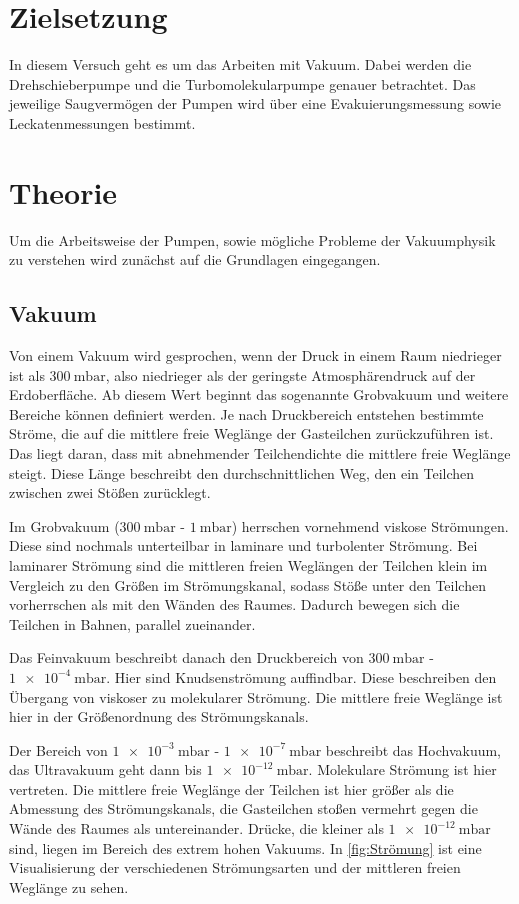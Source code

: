 \section{Zielsetzung}
    In diesem Versuch geht es um das Arbeiten mit Vakuum.
    Dabei werden die Drehschieberpumpe und die Turbomolekularpumpe genauer betrachtet.
    Das jeweilige Saugvermögen der Pumpen wird über eine Evakuierungsmessung sowie Leckatenmessungen bestimmt.

\section{Theorie}
\label{sec:Theorie}
    Um die Arbeitsweise der Pumpen, sowie mögliche Probleme der Vakuumphysik zu verstehen wird zunächst auf die Grundlagen eingegangen.
    \subsection{Vakuum}
        Von einem Vakuum wird gesprochen, wenn der Druck in einem Raum niedrieger ist als $\SI{300}{\milli\bar}$, also niedrieger als der geringste Atmosphärendruck auf der Erdoberfläche.
        Ab diesem Wert beginnt das sogenannte Grobvakuum und weitere Bereiche können definiert werden.
        Je nach Druckbereich entstehen bestimmte Ströme, die auf die mittlere freie Weglänge der Gasteilchen zurückzuführen ist.
        Das liegt daran, dass mit abnehmender Teilchendichte die mittlere freie Weglänge steigt.
        Diese Länge beschreibt den durchschnittlichen Weg, den ein Teilchen zwischen zwei Stößen zurücklegt. 

        \noindent
        Im Grobvakuum ($\SI{300}{\milli\bar}$ - $\SI{1}{\milli\bar}$) herrschen vornehmend viskose Strömungen.
        Diese sind nochmals unterteilbar in laminare und turbolenter Strömung.
        Bei laminarer Strömung sind die mittleren freien Weglängen der Teilchen klein im Vergleich zu den Größen im Strömungskanal, sodass Stöße unter den Teilchen vorherrschen als mit den Wänden des Raumes.
        Dadurch bewegen sich die Teilchen in Bahnen, parallel zueinander.

        \noindent
        Das Feinvakuum beschreibt danach den Druckbereich von $\SI{300}{\milli\bar}$ - $\SI{1e-4}{\milli\bar}$.
        Hier sind Knudsenströmung auffindbar.
        Diese beschreiben den Übergang von viskoser zu molekularer Strömung.
        Die mittlere freie Weglänge ist hier in der Größenordnung des Strömungskanals.

        \noindent
        Der Bereich von $\SI{1e-3}{\milli\bar}$ - $\SI{1e-7}{\milli\bar}$ beschreibt das Hochvakuum, das Ultravakuum geht dann bis $\SI{1e-12}{\milli\bar}$.
        Molekulare Strömung ist hier vertreten.
        Die mittlere freie Weglänge der Teilchen ist hier größer als die Abmessung des Strömungskanals, die Gasteilchen stoßen vermehrt gegen die Wände des Raumes als untereinander.
        \noindent
        Drücke, die kleiner als $\SI{1e-12}{\milli\bar}$ sind, liegen im Bereich des extrem hohen Vakuums.
        \noindent
        In \autoref{fig:Strömung} ist eine Visualisierung der verschiedenen Strömungsarten und der mittleren freien Weglänge zu sehen.

